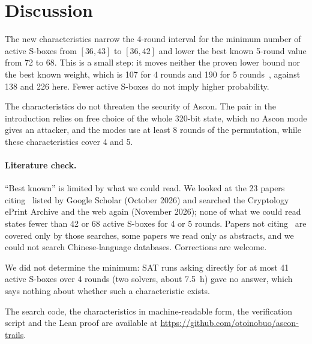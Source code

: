\documentclass[11pt,a4paper]{article}
\begin{document}
\section{Discussion}

The new characteristics narrow the 4-round interval for the minimum number of active S-boxes from
$[36,43]$ to $[36,42]$ and lower the best known 5-round value from 72 to 68. This is a small step: it moves neither the
proven lower bound nor the best known weight, which is 107 for 4 rounds and 190 for 5 rounds~\cite[Table~1]{EMMD22}, against 138 and 226 here. Fewer active S-boxes do not
imply higher probability.

The characteristics do not threaten the security of Ascon. The pair in the introduction relies on free choice of the whole 320-bit state, which no Ascon mode gives an attacker,
and the modes use at least 8 rounds of the permutation, while these characteristics cover 4 and 5.

\paragraph{Literature check.} ``Best known'' is limited by what we could read. We looked at the 23 papers citing~\cite{MR22} listed by
Google Scholar (October 2026) and searched the Cryptology ePrint Archive and the web again (November 2026); none of what we could read
states fewer than 42 or 68 active S-boxes for 4 or 5 rounds. Papers not citing~\cite{MR22} are covered only by those searches, some papers we read only as abstracts, and we could not
search Chinese-language databases. Corrections are welcome.

We did not determine the minimum: SAT runs asking directly for at most 41 active S-boxes over
4 rounds (two solvers, about 7.5~h) gave no answer, which says nothing about whether such a
characteristic exists.

The search code, the characteristics in machine-readable form, the verification script and the
Lean proof are available at \url{https://github.com/otoinobuo/ascon-trails}.
\end{document}
